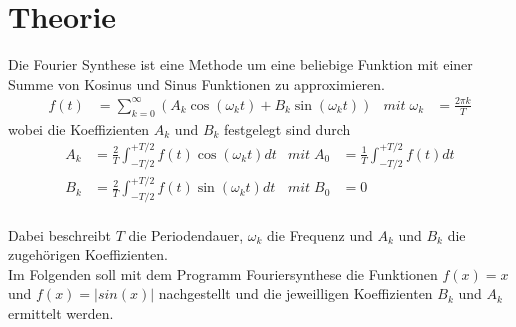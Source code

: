 \section{Theorie}
\label{sec:Theorie}
Die Fourier Synthese ist eine Methode um eine beliebige Funktion mit einer Summe von Kosinus und Sinus Funktionen zu approximieren.
\begin{align}
    f(t) &= \sum_{k=0}^{\infty} (A_k\cos(\omega_k t)+B_k\sin(\omega_k t)) &   mit \; \omega_k &= \frac{2\pi k}{T} \label{eqn:Fourier}
\end{align}
wobei die Koeffizienten $A_k$ und $B_k$ festgelegt sind durch
\begin{align}
    A_k &= \frac{2}{T} \int_{-T/2}^{+T/2} f(t)\cos(\omega_k t) dt    &  mit \; A_0 &= \frac{1}{T} \int_{-T/2}^{+T/2} f(t) dt \label{eqn:Ak}\\
    B_k &= \frac{2}{T} \int_{-T/2}^{+T/2} f(t)\sin(\omega_k t) dt    &  mit \; B_0 &= 0 \label{eqn:Bk}
\end{align}
\\
Dabei beschreibt $T$ die Periodendauer, $\omega_k$ die Frequenz und $A_k$ und $B_k$ die zugehörigen Koeffizienten. \\





Im Folgenden soll mit dem Programm Fouriersynthese \cite{Fouriersynthese}
die Funktionen $f(x)=x$ und $f(x)=|sin(x)|$ nachgestellt und die jeweilligen Koeffizienten $B_k$ und $A_k$ ermittelt werden.

